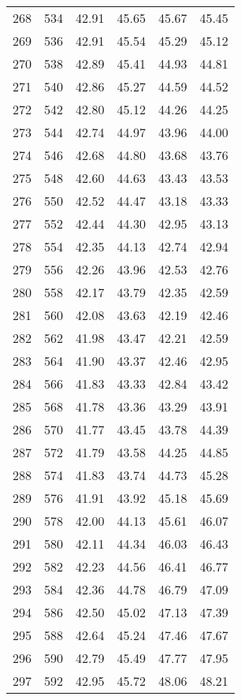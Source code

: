 \begin{longtable}{rrllll}
		268 & 534 & 42.91 & 45.65 & 45.67 & 45.45 \\ 
		269 & 536 & 42.91 & 45.54 & 45.29 & 45.12 \\ 
		270 & 538 & 42.89 & 45.41 & 44.93 & 44.81 \\ 
		271 & 540 & 42.86 & 45.27 & 44.59 & 44.52 \\ 
		272 & 542 & 42.80 & 45.12 & 44.26 & 44.25 \\ 
		273 & 544 & 42.74 & 44.97 & 43.96 & 44.00 \\ 
		274 & 546 & 42.68 & 44.80 & 43.68 & 43.76 \\ 
		275 & 548 & 42.60 & 44.63 & 43.43 & 43.53 \\ 
		276 & 550 & 42.52 & 44.47 & 43.18 & 43.33 \\ 
		277 & 552 & 42.44 & 44.30 & 42.95 & 43.13 \\ 
		278 & 554 & 42.35 & 44.13 & 42.74 & 42.94 \\ 
		279 & 556 & 42.26 & 43.96 & 42.53 & 42.76 \\ 
		280 & 558 & 42.17 & 43.79 & 42.35 & 42.59 \\ 
		281 & 560 & 42.08 & 43.63 & 42.19 & 42.46 \\ 
		282 & 562 & 41.98 & 43.47 & 42.21 & 42.59 \\ 
		283 & 564 & 41.90 & 43.37 & 42.46 & 42.95 \\ 
		284 & 566 & 41.83 & 43.33 & 42.84 & 43.42 \\ 
		285 & 568 & 41.78 & 43.36 & 43.29 & 43.91 \\ 
		286 & 570 & 41.77 & 43.45 & 43.78 & 44.39 \\ 
		287 & 572 & 41.79 & 43.58 & 44.25 & 44.85 \\ 
		288 & 574 & 41.83 & 43.74 & 44.73 & 45.28 \\ 
		289 & 576 & 41.91 & 43.92 & 45.18 & 45.69 \\ 
		290 & 578 & 42.00 & 44.13 & 45.61 & 46.07 \\ 
		291 & 580 & 42.11 & 44.34 & 46.03 & 46.43 \\ 
		292 & 582 & 42.23 & 44.56 & 46.41 & 46.77 \\ 
		293 & 584 & 42.36 & 44.78 & 46.79 & 47.09 \\ 
		294 & 586 & 42.50 & 45.02 & 47.13 & 47.39 \\ 
		295 & 588 & 42.64 & 45.24 & 47.46 & 47.67 \\ 
		296 & 590 & 42.79 & 45.49 & 47.77 & 47.95 \\ 
		297 & 592 & 42.95 & 45.72 & 48.06 & 48.21 \\ 

\end{longtable}
